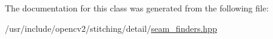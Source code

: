 The documentation for this class was generated from the following file\-:\begin{DoxyCompactItemize}
\item 
/usr/include/opencv2/stitching/detail/\hyperlink{seam__finders_8hpp}{seam\-\_\-finders.\-hpp}\end{DoxyCompactItemize}
